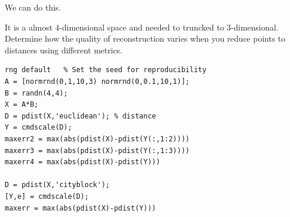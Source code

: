 \documentclass[a4paper, 11pt]{article}
\begin{document}
We can do this.

It is a almost 4-dimensional space and needed to truncked to 3-dimensional.
Determine how the quality of reconstruction 
varies when you reduce points to distances using different metrics.

\begin{lstlisting}
rng default   % Set the seed for reproducibility
A = [normrnd(0,1,10,3) normrnd(0,0.1,10,1)];
B = randn(4,4);
X = A*B;
D = pdist(X,'euclidean'); % distance
Y = cmdscale(D);
maxerr2 = max(abs(pdist(X)-pdist(Y(:,1:2)))) 
maxerr3 = max(abs(pdist(X)-pdist(Y(:,1:3)))) 
maxerr4 = max(abs(pdist(X)-pdist(Y)))

D = pdist(X,'cityblock');
[Y,e] = cmdscale(D);
maxerr = max(abs(pdist(X)-pdist(Y)))
\end{lstlisting}


\end{document}
